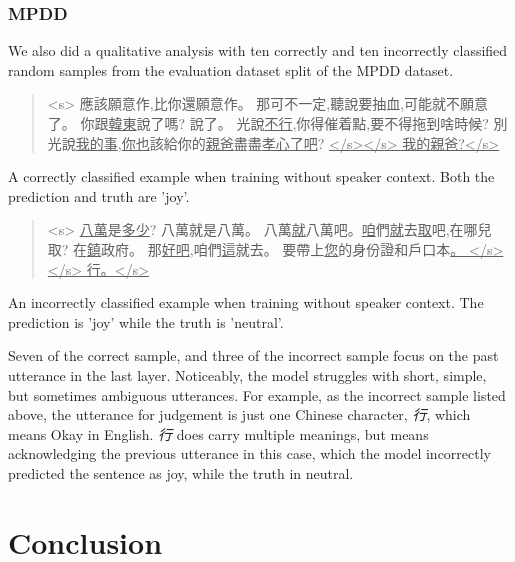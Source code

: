 \documentclass[11pt]{article}
\begin{document}
\subsubsection{MPDD}
We also did a qualitative analysis with ten correctly and ten incorrectly classified random samples from the evaluation dataset split of the MPDD dataset.


\begin{CJK*}{UTF8}{bsmi}
{\small
\begin{quote}

<s> 應該願意作,比你還願意作。 那可不一定,聽說要抽血,可能就不願意了。 你跟\underline{韓東}說了嗎? 說了。 光說\underline{不行},你得催着點,要不得拖到啥時候? 別光說\underline{我}\underline{的事},\underline{你也}該給你的\underline{親爸}盡盡\underline{孝心}\underline{了吧}? \underline{</s></s> 我的親爸?</s>}
\end{quote}

A correctly classified example when training without speaker context. Both the prediction and truth are 'joy'.

\begin{quote}

<s> \underline{八萬}是\underline{多少}? 八萬就是八萬。 八萬\underline{就}八萬吧。\underline{咱}們\underline{就}去\underline{取}吧,在哪兒取? 在\underline{鎮}政府。 那\underline{好吧},咱們\underline{這}就去。 要帶上\underline{您}的身份證和戶口本\underline{。 </s></s> 行。</s>}

\end{quote}

An incorrectly classified example when training without speaker context. The prediction is 'joy' while the truth is 'neutral'.}
\end{CJK*} 

\begin{CJK*}{UTF8}{bsmi}
Seven of the correct sample, and three of the incorrect sample focus on the past utterance in the last layer. Noticeably, the model struggles with short, simple, but sometimes ambiguous utterances. For example, as the incorrect sample listed above, the utterance for judgement is just one Chinese character, \textit{行}, which means Okay in English. \textit{行} does carry multiple meanings, but means acknowledging the previous utterance in this case, which the model incorrectly predicted the sentence as joy, while the truth in neutral.
\end{CJK*} 



\section{Conclusion}
\label{sect:conclusion}
\end{document}

